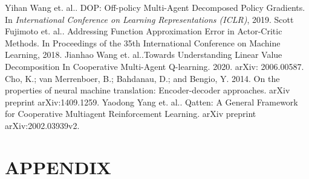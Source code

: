 \documentclass[runningheads]{llncs}
\begin{document}
\begin{thebibliography}{00}
	 Yihan Wang et. al.. DOP: Off-policy Multi-Agent Decomposed Policy Gradients. In \emph{International Conference on Learning Representations (ICLR)}, 2019.
	 Scott Fujimoto et. al.. Addressing Function Approximation Error in Actor-Critic Methods. In Proceedings of the 35th International Conference on
	Machine Learning, 2018.
	 Jianhao Wang et. al..Towards Understanding Linear Value Decomposition In Cooperative Multi-Agent Q-learning. 2020. arXiv: 2006.00587. 
	 Cho, K.; van Merrenboer, B.; Bahdanau, D.; and Bengio,
	Y. 2014. On the properties of neural machine
	translation: Encoder-decoder approaches. arXiv preprint
	arXiv:1409.1259.
	 Yaodong Yang et. al.. Qatten: A General Framework for Cooperative Multiagent Reinforcement Learning. arXiv preprint arXiv:2002.03939v2.
\end{thebibliography}

\section*{APPENDIX}



\begin{table*}[!htbp]
	\centering
	\caption{StarCraftII Micromanagement Maps Parameters}
\label{tab:booktabs}
\end{table*}
\end{document}
